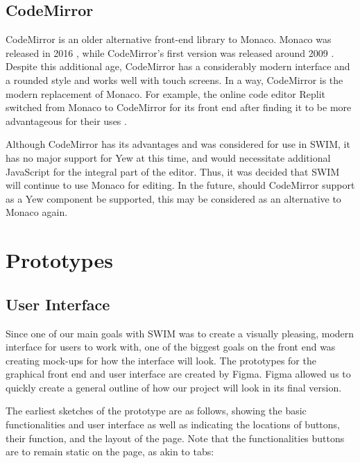 \documentclass[
    paper=letter,
    parskip=half,
    fontsize=12pt,
    titlepage=firstiscover,
    toc=bibliography,
    numbers=endperiod
]{scrartcl}
\let\oldsection\section
\renewcommand{\section}{\newpage\oldsection}
\begin{document}
\subsection{CodeMirror}

CodeMirror is an older alternative front-end library to Monaco. Monaco
was released in 2016 \cite{monaco-changelog}, while CodeMirror's first version was released
around 2009 \cite{codemirror-changelog}. Despite this additional age,
CodeMirror has a considerably modern interface and a rounded style and
works well with touch screens. In a way, CodeMirror is the modern
replacement of Monaco. For example, the online code editor Replit
switched from Monaco to CodeMirror for its front end after finding it to
be more advantageous for their uses \cite{replit-code-editors}.

Although CodeMirror has its advantages and was considered for use in
SWIM, it has no major support for Yew at this time, and would
necessitate additional JavaScript for the integral part of the editor.
Thus, it was decided that SWIM will continue to use Monaco for editing.
In the future, should CodeMirror support as a Yew component be
supported, this may be considered as an alternative to Monaco again.


\section{Prototypes}

\subsection{User Interface}

Since one of our main goals with SWIM was to create a visually pleasing,
modern interface for users to work with, one of the biggest goals on the
front end was creating mock-ups for how the interface will look. The
prototypes for the graphical front end and user interface are created by
Figma. Figma allowed us to quickly create a general outline of how our
project will look in its final version.

The earliest sketches of the prototype are as follows, showing the basic
functionalities and user interface as well as indicating the locations
of buttons, their function, and the layout of the page. Note that the
functionalities buttons are to remain static on the page, as akin to
tabs:
\end{document}
